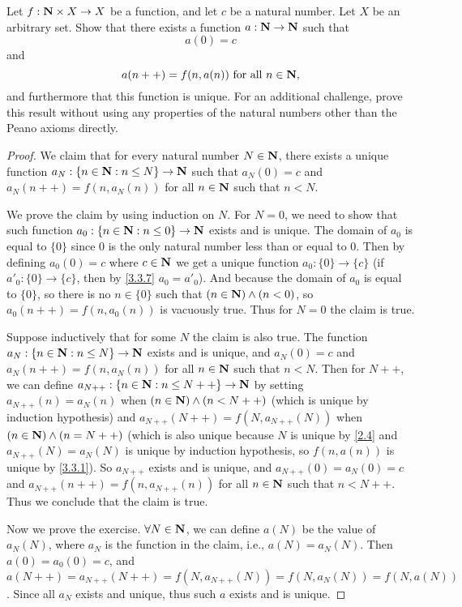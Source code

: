 \begin{exercise}\label{ex 3.5.12}
  Let \(f : \mathbf{N} \times X \to X\) be a function, and let \(c\) be a natural number.
  Let \(X\) be an arbitrary set.
  Show that there exists a function \(a : \mathbf{N} \to \mathbf{N}\) such that
  \[
    a(0) = c
  \]
  and
  \[
    a(n++) = f(n, a(n)) \text{ for all } n \in \mathbf{N},
  \]
  and furthermore that this function is unique.
  For an additional challenge, prove this result without using any properties of the natural numbers other than the Peano axioms directly.
\end{exercise}

\begin{proof}
  We claim that for every natural number \(N \in \mathbf{N}\), there exists a unique function \(a_N : \{n \in \mathbf{N} : n \leq N\} \to \mathbf{N}\) such that \(a_N(0) = c\) and \(a_N(n++) = f(n, a_{N}(n))\) for all \(n \in \mathbf{N}\) such that \(n < N\).

  We prove the claim by using induction on \(N\).
  For \(N = 0\), we need to show that such function \(a_0 : \{n \in \mathbf{N} : n \leq 0\} \to \mathbf{N}\) exists and is unique.
  The domain of \(a_0\) is equal to \(\{0\}\) since \(0\) is the only natural number less than or equal to \(0\).
  Then by defining \(a_0(0) = c\) where \(c \in \mathbf{N}\) we get a unique function \(a_0 : \{0\} \to \{c\}\) (if \(a'_0 : \{0\} \to \{c\}\), then by \cref{3.3.7} \(a_0 = a'_0\)).
  And because the domain of \(a_0\) is equal to \(\{0\}\), so there is no \(n \in \{0\}\) such that \((n \in \mathbf{N}) \land (n < 0)\), so \(a_0(n++) = f(n, a_0(n))\) is vacuously true.
  Thus for \(N = 0\) the claim is true.

  Suppose inductively that for some \(N\) the claim is also true.
  The function \(a_N : \{n \in \mathbf{N} : n \leq N\} \to \mathbf{N}\) exists and is unique, and \(a_N(0) = c\) and \(a_N(n++) = f(n, a_N(n))\) for all \(n \in \mathbf{N}\) such that \(n < N\).
  Then for \(N++\), we can define \(a_{N++} : \{n \in \mathbf{N} : n \leq N++\} \to \mathbf{N}\) by setting \(a_{N++}(n) = a_N(n)\) when \((n \in \mathbf{N}) \land (n < N++)\) (which is unique by induction hypothesis) and \(a_{N++}(N++) = f(N, a_{N++}(N))\) when \((n \in \mathbf{N}) \land (n = N++)\) (which is also unique because \(N\) is unique by \cref{2.4} and \(a_{N++}(N) = a_N(N)\) is unique by induction hypothesis, so \(f(n, a(n))\) is unique by \cref{3.3.1}).
  So \(a_{N++}\) exists and is unique, and \(a_{N++}(0) = a_N(0) = c\) and \(a_{N++}(n++) = f(n, a_{N++}(n))\) for all \(n \in \mathbf{N}\) such that \(n < N++\).
  Thus we conclude that the claim is true.

  Now we prove the exercise.
  \(\forall N \in \mathbf{N}\), we can define \(a(N)\) be the value of \(a_N(N)\), where \(a_N\) is the function in the claim, i.e., \(a(N) = a_{N}(N)\).
  Then \(a(0) = a_0(0) = c\), and \(a(N++) = a_{N++}(N++) = f(N, a_{N++}(N)) = f(N, a_{N}(N)) = f(N, a(N))\).
  Since all \(a_N\) exists and unique, thus such \(a\) exists and is unique.


\end{proof}
